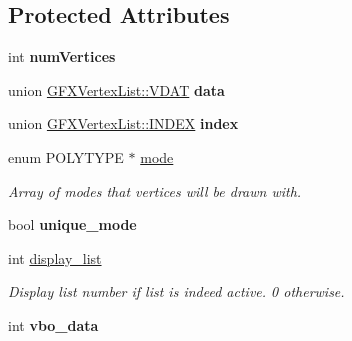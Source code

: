\subsection*{Protected Attributes}
\begin{DoxyCompactItemize}
\item 
int {\bfseries num\+Vertices}\hypertarget{classGFXVertexList_a06d823718d174da3f29e0c51581ed43e}{}\label{classGFXVertexList_a06d823718d174da3f29e0c51581ed43e}

\item 
union \hyperlink{unionGFXVertexList_1_1VDAT}{G\+F\+X\+Vertex\+List\+::\+V\+D\+AT} {\bfseries data}\hypertarget{classGFXVertexList_abfc802c05f439d9466149d4d2100077e}{}\label{classGFXVertexList_abfc802c05f439d9466149d4d2100077e}

\item 
union \hyperlink{unionGFXVertexList_1_1INDEX}{G\+F\+X\+Vertex\+List\+::\+I\+N\+D\+EX} {\bfseries index}\hypertarget{classGFXVertexList_aa14c94ea8236d9f75eda0af2baeeb5dc}{}\label{classGFXVertexList_aa14c94ea8236d9f75eda0af2baeeb5dc}

\item 
enum P\+O\+L\+Y\+T\+Y\+PE $\ast$ \hyperlink{classGFXVertexList_af5a1158f2be60e95d24093a6d930c6a3}{mode}\hypertarget{classGFXVertexList_af5a1158f2be60e95d24093a6d930c6a3}{}\label{classGFXVertexList_af5a1158f2be60e95d24093a6d930c6a3}

\begin{DoxyCompactList}\small\item\em Array of modes that vertices will be drawn with. \end{DoxyCompactList}\item 
bool {\bfseries unique\+\_\+mode}\hypertarget{classGFXVertexList_a19827e0e7e4a715b5e693b544a1fa8ce}{}\label{classGFXVertexList_a19827e0e7e4a715b5e693b544a1fa8ce}

\item 
int \hyperlink{classGFXVertexList_a9b76a564361a63b71b846a79ef07ec29}{display\+\_\+list}\hypertarget{classGFXVertexList_a9b76a564361a63b71b846a79ef07ec29}{}\label{classGFXVertexList_a9b76a564361a63b71b846a79ef07ec29}

\begin{DoxyCompactList}\small\item\em Display list number if list is indeed active. 0 otherwise. \end{DoxyCompactList}\item 
int {\bfseries vbo\+\_\+data}\hypertarget{classGFXVertexList_a2f7aec434935bfb31fa71ba7914643b4}{}\label{classGFXVertexList_a2f7aec434935bfb31fa71ba7914643b4}


\end{DoxyCompactItemize}
